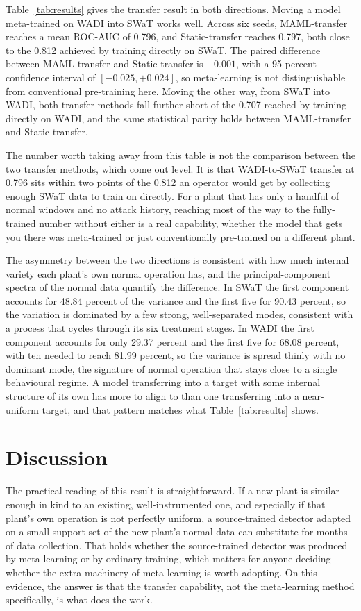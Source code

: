 \documentclass[conference]{IEEEtran}
\begin{document}
Table~\ref{tab:results} gives the transfer result in both directions. Moving
a model meta-trained on WADI into SWaT works well. Across six seeds,
MAML-transfer reaches a mean ROC-AUC of 0.796, and Static-transfer reaches
0.797, both close to the 0.812 achieved by training directly on SWaT. The
paired difference between MAML-transfer and Static-transfer is $-0.001$,
with a 95 percent confidence interval of $[-0.025, +0.024]$, so
meta-learning is not distinguishable from conventional pre-training here.
Moving the other way, from SWaT into WADI, both transfer methods fall
further short of the 0.707 reached by training directly on WADI, and the
same statistical parity holds between MAML-transfer and Static-transfer.

The number worth taking away from this table is not the comparison between
the two transfer methods, which come out level. It is that WADI-to-SWaT
transfer at 0.796 sits within two points of the 0.812 an operator would get
by collecting enough SWaT data to train on directly. For a plant that has
only a handful of normal windows and no attack history, reaching most of the
way to the fully-trained number without either is a real capability,
whether the model that gets you there was meta-trained or just
conventionally pre-trained on a different plant.

The asymmetry between the two directions is consistent with how much
internal variety each plant's own normal operation has, and the
principal-component spectra of the normal data quantify the difference. In
SWaT the first component accounts for 48.84 percent of the variance and the
first five for 90.43 percent, so the variation is dominated by a few strong,
well-separated modes, consistent with a process that cycles through its six
treatment stages. In WADI the first component accounts for only 29.37
percent and the first five for 68.08 percent, with ten needed to reach 81.99
percent, so the variance is spread thinly with no dominant mode, the
signature of normal operation that stays close to a single behavioural
regime. A model transferring into a target with some internal structure of
its own has more to align to than one transferring into a near-uniform
target, and that pattern matches what Table~\ref{tab:results} shows.

\section{Discussion}

The practical reading of this result is straightforward. If a new plant is
similar enough in kind to an existing, well-instrumented one, and especially
if that plant's own operation is not perfectly uniform, a source-trained
detector adapted on a small support set of the new plant's normal data can
substitute for months of data collection. That holds whether the
source-trained detector was produced by meta-learning or by ordinary
training, which matters for anyone deciding whether the extra machinery of
meta-learning is worth adopting. On this evidence, the answer is that the
transfer capability, not the meta-learning method specifically, is what does
the work.
\end{document}

